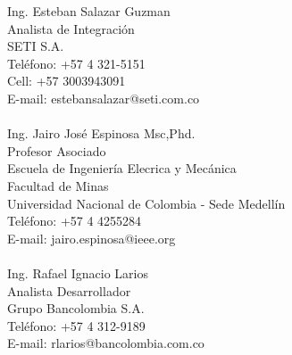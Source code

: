 \begin{resume}
 Ing. Esteban Salazar Guzman\\
 Analista de Integraci\'{o}n  \\
 SETI S.A. \\
 Tel\'{e}fono: +57 4 321-5151 \\
 Cell: +57 3003943091 \\ 
 E-mail: estebansalazar@seti.com.co\\
 \\  
 Ing. Jairo Jos\'{e} Espinosa Msc,Phd.\\
 Profesor Asociado \\
 Escuela de Ingenier\'{i}a Elecrica y Mec\'{a}nica \\
 Facultad de Minas \\
 Universidad Nacional de Colombia - Sede  Medell\'{i}n\\
 Tel\'{e}fono: +57 4 4255284 \\
 E-mail: jairo.espinosa@ieee.org\\
 \\  
 Ing. Rafael Ignacio Larios\\
 Analista Desarrollador \\
 Grupo Bancolombia S.A. \\
 Tel\'{e}fono: +57 4 312-9189  \\
 E-mail: rlarios@bancolombia.com.co 
\end{resume}

